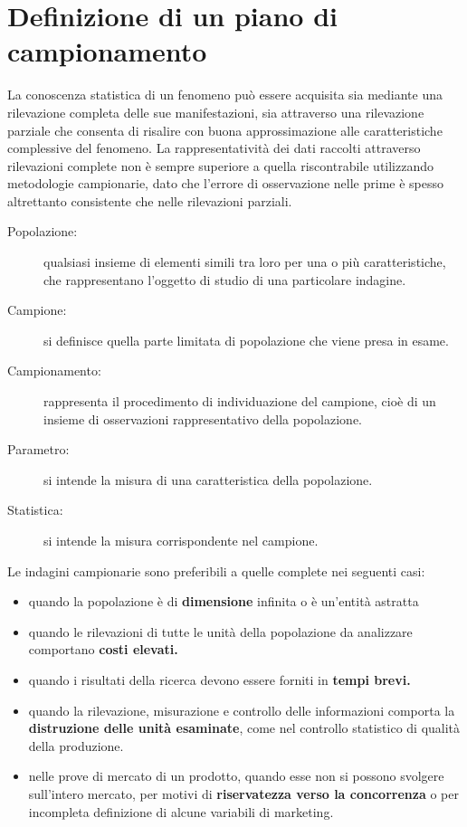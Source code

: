\section{Definizione di un piano di campionamento}
La conoscenza statistica di un fenomeno può essere acquisita sia mediante una rilevazione completa delle sue manifestazioni, sia attraverso una rilevazione parziale che consenta di risalire con buona approssimazione alle caratteristiche complessive del fenomeno. La rappresentatività dei dati raccolti attraverso rilevazioni complete non è sempre superiore a quella riscontrabile utilizzando metodologie campionarie, dato che l’errore di osservazione nelle prime è spesso altrettanto consistente che nelle rilevazioni parziali.
\begin{description}
	\item[Popolazione:] qualsiasi insieme di elementi simili tra loro per una o più caratteristiche, che rappresentano l’oggetto di studio di una particolare indagine.
	\item[Campione:] si definisce quella parte limitata di popolazione che viene presa in esame.
	\item[Campionamento:] rappresenta il procedimento di individuazione del campione, cioè di un insieme di osservazioni rappresentativo della popolazione.
	\item[Parametro:] si intende la misura di una caratteristica della popolazione.
	\item[Statistica:] si intende la misura corrispondente nel campione.
\end{description}
Le indagini campionarie sono preferibili a quelle complete nei seguenti casi: 
\begin{itemize}
	\item quando la popolazione è di \textbf{dimensione} infinita o è un’entità astratta
	\item quando le rilevazioni di tutte le unità della popolazione da analizzare comportano \textbf{costi elevati.}
	\item quando i risultati della ricerca devono essere forniti in \textbf{tempi brevi.}
	\item quando la rilevazione, misurazione e controllo delle informazioni comporta la \textbf{distruzione delle unità esaminate}, come nel controllo statistico di qualità della produzione.
	\item nelle prove di mercato di un prodotto, quando esse non si possono svolgere sull'intero mercato, per motivi di \textbf{riservatezza verso la concorrenza} o per incompleta definizione di alcune variabili di marketing.
\end{itemize}

